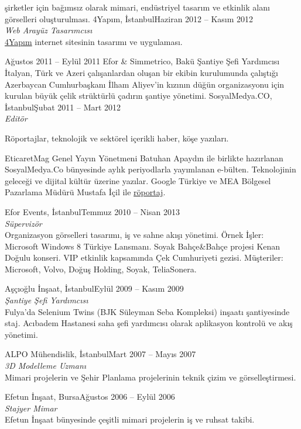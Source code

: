 \documentclass[8pt]{scrartcl}
\newenvironment{xplist}{%
  \setlist{nosep}
  \newcommand\xpitem[4]{%
    {\color[HTML]{801040}%
      \sc##2\hfill ##1}\\[2pt]
    {\Large\textit{##3}
      \smallskip} \\%
    {##4\bigskip}%

  }}%
{\setlist{}}
\begin{document}
\begin{xplist}
{{      şirketler için  bağımsız olarak  mimari, endüstriyel  tasarım ve
      etkinlik alanı görselleri oluşturulması.}%
    \xpitem%
    {Haziran 2012 -- Kasım 2012}%
    {4Yapım, İstanbul}%
    {Web Arayüz Tasarımcısı}{%
      \href{http://www.4yapim.com/}{4Yapım}     internet     sitesinin
      tasarımı ve uygulaması.}%
    \xpitme%
    {Ağustos 2011 -- Eylül 2011}%
    {Efor \& Simmetrico, Bakü}%
    {Şantiye Şefi Yardımcısı}{%
      İtalyan,  Türk   ve  Azeri   çalışanlardan  oluşan   bir  ekibin
      kurulumunda çalıştığı  Azerbaycan Cumhurbaşkanı  İlham Aliyev'in
      kızının düğün organizasyonu için  kurulan büyük çelik strüktürlü
      çadırın şantiye yönetimi.}%
    \xpitem%
    {Şubat 2011 -- Mart 2012}%
    {SosyalMedya.CO, İstanbul}%
    {Editör}{%
      Röportajlar,  teknolojik   ve  sektörel  içerikli   haber,  köşe
      yazıları.

      EticaretMag Genel  Yayın Yönetmeni Batuhan Apaydın  ile birlikte
      hazırlanan   SosyalMedya.Co    bünyesinde   aylık   periyodlarla
      yayımlanan  e-bülten. Teknolojinin  geleceği  ve dijital  kültür
      üzerine yazılar. Google Türkiye ve MEA Bölgesel Pazarlama Müdürü
      Mustafa                         İçil                         ile
      \href{http://sosyalmedya.co/google-mustafa-icil/}{röportaj}.}%
    \xpitem%
    {Temmuz 2010 -- Nisan 2013}%
    {Efor Events, İstanbul}%
    {Süpervizör}{%
      Organizasyon görselleri  tasarımı, iş  ve sahne  akışı yönetimi.
      Örnek  İşler:  Microsoft  Windows  8  Türkiye  Lansmanı.   Soyak
      Bahçe\&Bahçe  projesi   Kenan  Doğulu  konseri.    VIP  etkinlik
      kapsamında  Çek  Cumhuriyeti   gezisi.   Müşteriler:  Microsoft,
      Volvo, Doğuş Holding, Soyak, TeliaSonera.}%
    \xpitem%
    {Eylül 2009 -- Kasım 2009}%
    {Aşçıoğlu İnşaat, İstanbul}%
    {Şantiye Şefi Yardımcısı}{%
      Fulya'da Selenium  Twins (BJK  Süleyman Seba  Kompleksi) inşaatı
      şantiyesinde  staj.   Acıbadem  Hastanesi saha  şefi  yardımcısı
      olarak aplikasyon kontrolü ve akış yönetimi.  }%
    \xpitem%
    {Mart 2007 -- Mayıs 2007}%
    {ALPO Mühendislik, İstanbul}%
    {3D Modelleme Uzmanı}{%
      Mimari projelerin ve Şehir Planlama projelerinin teknik çizim ve
      görselleştirmesi.  }%
    \xpitem%
    {Ağustos 2006 -- Eylül 2006}%
    {Efetun İnşaat, Bursa}%
    {Stajyer Mimar}{%
      Efetun İnşaat bünyesinde çeşitli  mimari projelerin iş ve ruhsat
      takibi.}}%
\end{xplist}
\end{document}
